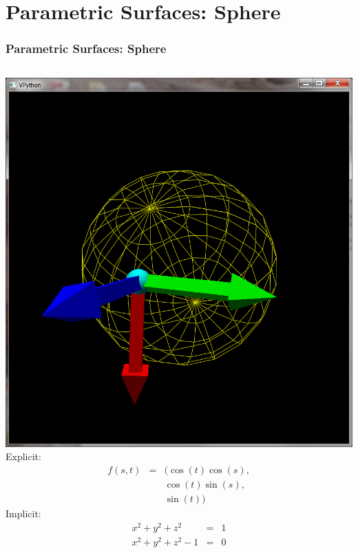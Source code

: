\documentclass[slidestop,xcolor=pst]{beamer}
\newcommand{\sect}[1]{
\section{#1}
\begin{frame}[fragile]\frametitle{#1}
}
\begin{document}
\sect{Parametric Surfaces: Sphere}
\begin{columns}[c]
\includegraphics[width=\textwidth]{images/vpythonpsphere.png}
Explicit:
\begin{eqnarray*}
f(s,t) &=& (\cos(t)\cos(s),\\&&\cos(t)\sin(s),\\&&\sin(t))
\end{eqnarray*}
Implicit:
\begin{eqnarray*}
x^2 + y^2 + z^2 &=& 1\\
x^2 + y^2 + z^2 - 1 &=& 0
\end{eqnarray*}
\end{columns}
\end{frame}
\end{document}
